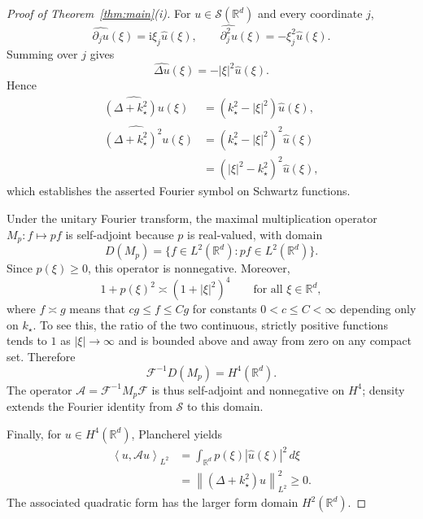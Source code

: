 \documentclass[11pt]{article}
\theoremstyle{remark}
\newcommand{\R}{\mathbb{R}}
\newcommand{\sS}{\mathcal{S}}
\newcommand{\sA}{\mathcal{A}}
\newcommand{\sF}{\mathcal{F}}
\newcommand{\ii}{\mathrm{i}}
\newcommand{\norm}[1]{\left\lVert #1\right\rVert}
\newcommand{\abs}[1]{\left\lvert #1\right\rvert}
\newcommand{\inner}[2]{\left\langle #1,#2\right\rangle}
\begin{document}
\begin{proof}[Proof of Theorem~\ref{thm:main}(i)]
For $u\in\sS(\R^d)$ and every coordinate $j$,
\begin{equation}
\widehat{\partial_j u}(\xi)=\ii\xi_j\widehat u(\xi),
\qquad
\widehat{\partial_j^2u}(\xi)=-\xi_j^2\widehat u(\xi).
\end{equation}
Summing over $j$ gives
\begin{equation}
\widehat{\Delta u}(\xi)=-\abs{\xi}^2\widehat u(\xi).
\end{equation}
Hence
\begin{align}
\widehat{(\Delta+k_\star^2)u}(\xi)
&=(k_\star^2-\abs{\xi}^2)\widehat u(\xi),\\
\widehat{(\Delta+k_\star^2)^2u}(\xi)
&=(k_\star^2-\abs{\xi}^2)^2\widehat u(\xi)\\
&=(\abs{\xi}^2-k_\star^2)^2\widehat u(\xi),
\end{align}
which establishes the asserted Fourier symbol on Schwartz functions.

Under the unitary Fourier transform, the maximal multiplication operator
$M_p:f\mapsto pf$ is self-adjoint because $p$ is real-valued, with domain
\begin{equation}\label{eq:operator-domain}
D(M_p)=\{f\in L^2(\R^d):pf\in L^2(\R^d)\}.
\end{equation}
Since $p(\xi)\ge0$, this operator is nonnegative.  Moreover,
\begin{equation}\label{eq:equivalence}
1+p(\xi)^2\asymp(1+\abs{\xi}^2)^4
\qquad\text{for all }\xi\in\R^d,
\end{equation}
where $f\asymp g$ means that $c g\le f\le Cg$ for constants
$0<c\le C<\infty$ depending only on $k_\star$.
To see this, the ratio of the two continuous, strictly positive
functions tends to $1$ as $\abs{\xi}\to\infty$ and is bounded above and
away from zero on any compact set.  Therefore
\begin{equation}
\sF^{-1}D(M_p)=H^4(\R^d).
\end{equation}
The operator $\sA=\sF^{-1}M_p\sF$ is thus self-adjoint and
nonnegative on $H^4$; density extends the Fourier identity from
$\sS$ to this domain.

Finally, for $u\in H^4(\R^d)$, Plancherel yields
\begin{align}
\inner{u}{\sA u}_{L^2}
&=\int_{\R^d}p(\xi)\abs{\widehat u(\xi)}^2\,d\xi\\
&=\norm{(\Delta+k_\star^2)u}_{L^2}^2\ge0.
\end{align}
The associated quadratic form has the larger form domain $H^2(\R^d)$.
\end{proof}
\end{document}
